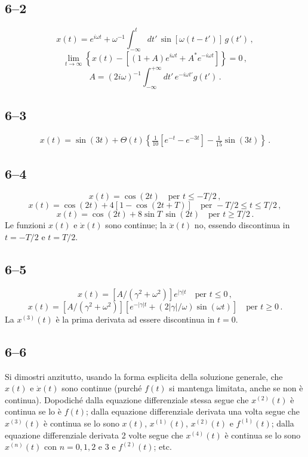 \documentclass[11pt, a4paper]{book}
\numberwithin{equation}{section}
\begin{document}
\subsection*{6--2}
\[
    x(t) = e^{i\omega t} + \omega^{-1} \int_{-\infty}^{t} dt' \, \sin[\omega(t-t')] \, g(t') \,,
\]
\[
    \lim_{t\to\infty} \left\{ x(t) - \left[ (1+A) e^{i\omega t} + A^* e^{-i\omega t} \right] \right\} = 0 \,,
\]
\[
    A = (2i\omega)^{-1} \int_{-\infty}^{+\infty} dt' \, e^{-i\omega t'} g(t') \,.
\]

\subsection*{6--3}
\[
    x(t) = \sin(3t) + \Theta(t) \left\{ \tfrac{1}{10}\left[ e^{-t} - e^{-3t} \right] - \tfrac{1}{15}\sin(3t) \right\} \,.
\]

\subsection*{6--4}
\[
    x(t) = \cos(2t) \quad \text{per } t \leq -T/2 \,,
\]
\[
    x(t) = \cos(2t) + 4\left[ 1 - \cos(2t+T) \right] \quad \text{per } -T/2 \leq t \leq T/2 \,,
\]
\[
    x(t) = \cos(2t) + 8\sin T \, \sin(2t) \quad \text{per } t \geq T/2 \,.
\]
Le funzioni $x(t)$ e $\dot{x}(t)$ sono continue; la $\ddot{x}(t)$ no, essendo discontinua
in $t = -T/2$ e $t = T/2$.

\subsection*{6--5}
\[
    x(t) = \left[ A/(\gamma^2+\omega^2) \right] e^{|\gamma|t} \quad \text{per } t \leq 0 \,,
\]
\[
    x(t) = \left[ A/(\gamma^2+\omega^2) \right] \left[ e^{-|\gamma|t} + (2|\gamma|/\omega)\sin(\omega t) \right] \quad \text{per } t \geq 0 \,.
\]
La $x^{(3)}(t)$ è la prima derivata ad essere discontinua in $t = 0$.

\subsection*{6--6}
Si dimostri anzitutto, usando la forma esplicita della soluzione generale, che
$x(t)$ e $\dot{x}(t)$ sono continue (purché $f(t)$ si mantenga limitata, anche se non
è continua). Dopodiché dalla equazione differenziale stessa segue che
$x^{(2)}(t)$ è continua se lo è $f(t)$; dalla equazione differenziale derivata una
volta segue che $x^{(3)}(t)$ è continua se lo sono $x(t)$, $x^{(1)}(t)$, $x^{(2)}(t)$ e
$f^{(1)}(t)$; dalla equazione differenziale derivata 2 volte segue che $x^{(4)}(t)$
è continua se lo sono $x^{(n)}(t)$ con $n = 0,1,2$ e $3$ e $f^{(2)}(t)$; etc.
\end{document}
